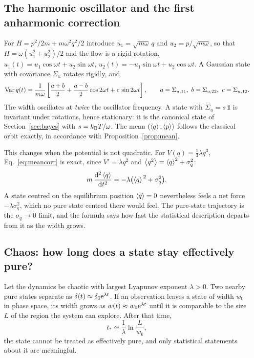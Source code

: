\subsection{The harmonic oscillator and the first anharmonic correction}

For $H=p^2/2m+m\omega^2q^2/2$ introduce $u_1=\sqrt{m\omega}\,q$ and $u_2=p/\sqrt{m\omega}$, so that $H=\omega(u_1^2+u_2^2)/2$ and the flow is a rigid rotation, $u_1(t)=u_1\cos\omega t+u_2\sin\omega t$, $u_2(t)=-u_1\sin\omega t+u_2\cos\omega t$. A Gaussian state with covariance $\Sigma_u$ rotates rigidly, and
\begin{equation}
\operatorname{Var} q(t)=\frac1{m\omega}\left[\frac{a+b}2+\frac{a-b}2\cos2\omega t+c\,\sin2\omega t\right],\qquad
a=\Sigma_{u,11},\ b=\Sigma_{u,22},\ c=\Sigma_{u,12}.
\end{equation}
The width oscillates at \emph{twice} the oscillator frequency. A state with $\Sigma_u=s\,\mathbb 1$ is invariant under rotations, hence stationary: it is the canonical state of Section~\ref{sec:bayes} with $s=k_{\mathrm B} T/\omega$. The mean $(\left\langle q\right\rangle,\left\langle p\right\rangle)$ follows the classical orbit exactly, in accordance with Proposition~\ref{prop:mean}.

This changes when the potential is not quadratic. For $V(q)=\tfrac13\lambda q^3$, Eq.~\eqref{eq:meancorr} is exact, since $V'=\lambda q^2$ and $\left\langle q^2\right\rangle=\left\langle q\right\rangle^2+\sigma_q^2$:
\begin{equation}
m\,\frac{\mathrm{d}^2\left\langle q\right\rangle}{\mathrm{d} t^2}=-\lambda\bigl(\left\langle q\right\rangle^{\,2}+\sigma_q^2\bigr).
\end{equation}
A state centred on the equilibrium position $\left\langle q\right\rangle=0$ nevertheless feels a net force $-\lambda\sigma_q^2$, which no pure state centred there would feel. The pure-state trajectory is the $\sigma_q\to0$ limit, and the formula says how fast the statistical description departs from it as the width grows.

\subsection{Chaos: how long does a state stay effectively pure?}
\label{sec:chaos}

Let the dynamics be chaotic with largest Lyapunov exponent $\lambda>0$. Two nearby pure states separate as $\delta(t)\approx\delta_0\mathrm{e}^{\lambda t}$. If an observation leaves a state of width $w_0$ in phase space, its width grows as $w(t)\approx w_0\mathrm{e}^{\lambda t}$ until it is comparable to the size $L$ of the region the system can explore. After that time,
\begin{equation}
t_*\simeq\frac1\lambda\ln\frac L{w_0},
\label{eq:predictability}
\end{equation}
the state cannot be treated as effectively pure, and only statistical statements about it are meaningful.


